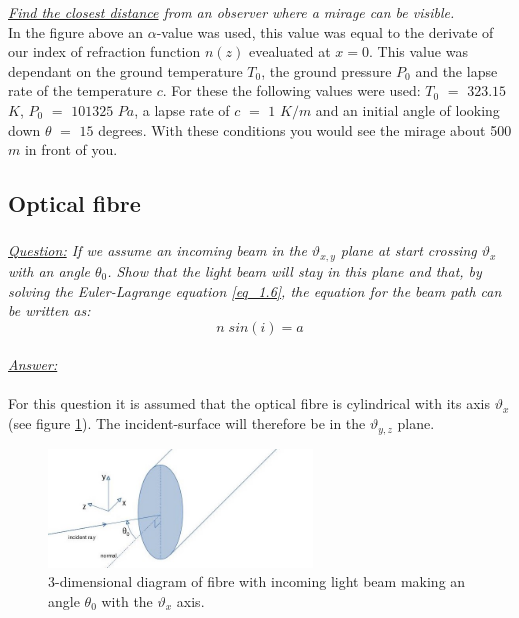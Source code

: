 \documentclass{article}
\begin{document}
\textit{\underline{Find the closest distance} from an observer where a mirage can be visible.}\\
In the figure above an $\alpha$-value was used, this value was equal to the derivate of our index of refraction function $n(z)$ evealuated at $x=0$. This value was dependant on the ground temperature $T_0$, the ground pressure $P_0$ and the lapse rate of the temperature $c$. For these the following values were used: $T_0$ $=$ $323.15$ $K$, $P_0$ $=$ $101325$ $Pa$, a lapse rate of $c$ $=$ $1$ $K/m$ and an initial angle of looking down $\theta$ $=$ $15$ degrees. With these conditions you would see the mirage about 500 $m$ in front of you.\\

\subsection{Optical fibre}

\subsubsection{}

\textit{\underline{Question:} If we assume an incoming beam in the $\vartheta _{x,y}$ plane at start crossing $\vartheta _x$ with an angle $\theta _0$. Show that the light beam will stay in this plane and that, by solving the Euler-Lagrange equation \ref{eq_1.6}, the equation for the beam path can be written as:}\\
\begin{equation}
	n \; sin(i) = a
	\label{eq_2.1}
\end{equation}
\\
\textit{\underline{Answer:}} \\
\\

For this question it is assumed that the optical fibre is cylindrical with its axis $\vartheta _x$ (see figure \ref{fig_fibre_3d}). The incident-surface will therefore be in the $\vartheta _{y,z}$ plane.\\

\begin{figure}[h!]
	\centering
	\includegraphics[width=7cm]{afbeeldingen/fibre_3d.jpg}
	\caption{3-dimensional diagram of fibre with incoming light beam making an angle $\theta _0$ with the $\vartheta _x$ axis.}
	\label{fig_fibre_3d}
\end{figure}
\end{document}
